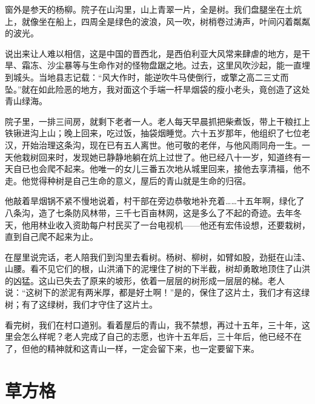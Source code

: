 \documentclass[12pt,UTF-8,openany]{ctexbook}
\begin{document}
\begin{large}
    
    窗外是参天的杨柳。院子在山沟里，山上青翠一片，全是树。我们盘腿坐在土炕上，就像坐在船上，四周全是绿色的波浪，风一吹，树梢卷过涛声，叶间闪着粼粼的波光。
    
    说出来让人难以相信，这是中国的晋西北，是西伯利亚大风常来肆虐的地方，是干旱、霜冻、沙尘暴等与生命作对的怪物盘踞之地。过去，这里风吹沙起，能一直埋到城头。当地县志记载：“风大作时，能逆吹牛马使倒行，或擎之高二三丈而坠。”就在如此险恶的地方，我对面这个手端一杆旱烟袋的瘦小老头，竟创造了这处青山绿海。
    
    院子里，一排三间房，就剩下老者一人。老人每天早晨抓把柴煮饭，带上干粮扛上铁锹进沟上山；晚上回来，吃过饭，抽袋烟睡觉。六十五岁那年，他组织了七位老汉，开始治理这条沟，现在已有五人离世。他可敬的老伴，与他风雨同舟一生。一天他栽树回来时，发现她已静静地躺在炕上过世了。他已经八十一岁，知道终有一天自已也会爬不起来。他唯一的女儿三番五次地从城里回来，接他去享清福，他不走。他觉得种树是自己生命的意义，屋后的青山就是生命的归宿。
    
    他敲着旱烟锅不紧不慢地说着，村干部在旁边恭敬地补充着……十五年啊，绿化了八条沟，造了七条防风林带，三千七百亩林网，这是多么了不起的奇迹。去年冬天，他用林业收入资助每户村民买了一台电视机——他还有宏伟设想，还要栽树，直到自己爬不起来为止。
    
    在屋里说完话，老人陪我们到沟里去看树。杨树、柳树，如臂如股，劲挺在山洼、山腰。看不见它们的根，山洪涌下的泥埋住了树的下半截，树却勇敢地顶住了山洪的凶猛。这山已失去了原来的坡形，依着一层层的树形成一层层的梯。老人说：“这树下的淤泥有两米厚，都是好土啊！”是的，保住了这片土，我们才有这绿树；有了这绿树，我们才守住了这片土。
    
    看完树，我们在村口道别。看着屋后的青山，我不禁想，再过十五年，三十年，这里会怎么样呢？老人完成了自己的志愿，也许十五年后，三十年后，他已经不在了，但他的精神就和这青山一样，一定会留下来，也一定要留下来。
    
\end{large}



\chapter{草方格}
\end{document}
